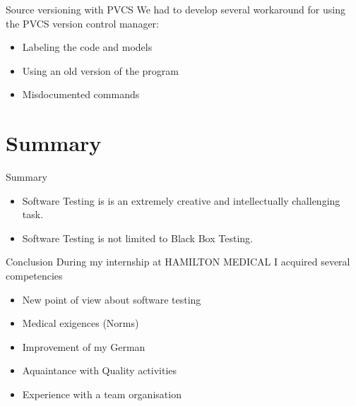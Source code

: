 \documentclass{beamer}
\begin{document}
\begin{frame}{Source versioning with PVCS}
We had to develop several workaround for using the PVCS version control manager:
\begin{itemize}
\item Labeling the code and models
\item Using an old version of the program
\item Misdocumented commands
\end{itemize}
\end{frame}




\section*{Summary}

\begin{frame}{Summary}

  \begin{itemize}
  \item
    \alert{Software Testing} is is an extremely creative and intellectually 
    challenging task.
  \item
    Software Testing is \alert{not} limited to Black Box Testing.
  \end{itemize}
\end{frame}

\begin{frame}{Conclusion}
During my internship at HAMILTON MEDICAL I acquired several competencies
\begin{itemize}
\item New point of view about software testing
\item Medical exigences (Norms)
\item Improvement of my German
\item Aquaintance with Quality activities
\item Experience with a team organisation
\end{itemize}
\end{frame}
\end{document}
